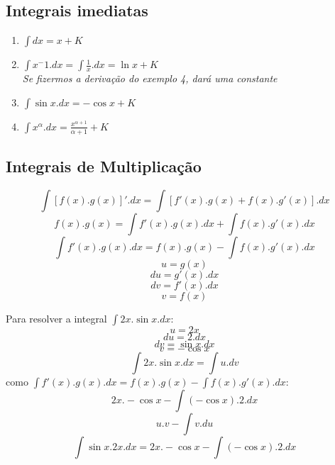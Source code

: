 \documentclass{article}
\begin{document}
		\subsection{Integrais imediatas}
			\begin{enumerate}
				\item $\int dx = x+K$
				\item $\int x^-1.dx = \int \frac{1}{x}.dx = \ln x+K$ \\ \textit{Se fizermos a derivação do exemplo 4, dará uma constante}
				\item $\int \sin x . dx = -\cos x +K$
				\item $\int x^\alpha .dx = \frac{x^{\alpha+1}}{\alpha+1}+K$
			\end{enumerate}
		\subsection{Integrais de Multiplicação}
			$$\int [f(x).g(x)]'.dx = \int[f'(x).g(x)+f(x).g'(x)].dx$$
			$$f(x).g(x) = \int f'(x).g(x).dx + \int f(x).g'(x).dx$$
			$$\int f'(x).g(x).dx = f(x).g(x) - \int f(x).g'(x).dx$$
				$$u = g(x)$$
				$$du = g'(x).dx$$
				$$dv = f'(x).dx$$			
				$$v = f(x)$$
			
			
			Para resolver a integral $\int 2x. \sin x .dx$:\\
				$$u = 2x$$
				$$du = 2.dx$$
				$$dv = \sin x.dx$$
				$$v = -\cos x$$
			$$\int 2x. \sin x . dx = \int u . dv$$
			como $\int f'(x).g(x).dx = f(x).g(x)-\int f(x).g'(x).dx$:
			$$2x. - \cos x - \int ( - \cos x ).2.dx$$
			$$u.v- \int v.du$$
			$$\int \sin x.2x.dx = 2x. - \cos x - \int (- \cos x).2.dx$$
\end{document}
